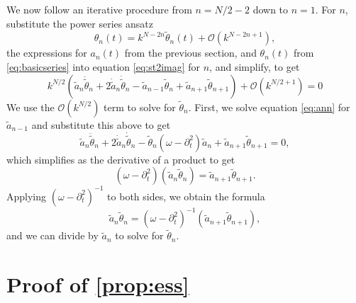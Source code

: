 \documentclass[11pt,reqno]{amsart}
\begin{document}
We now follow an iterative procedure from $n=N/2-2$ down to $n=1$. For $n$, substitute the power series ansatz
\[
\theta_{n}(t) = k^{N-2n} \tilde{\theta}_{n}(t) + \mathcal{O}(k^{N-2n+1}),
\]
the expressions for $a_n(t)$ from the previous section, and $\theta_n(t)$ from \cref{eq:basicseries} into equation \cref{eq:st2imag} for $n$, and simplify, to get
\[
k^{N/2} \left( \tilde{a}_n \ddot{\tilde{\theta}}_n + 2 \dot{\tilde{a}}_n \dot{\tilde{\theta}}_n
- \tilde{a}_{n-1} \tilde{\theta}_n + \tilde{a}_{n+1}\tilde{\theta}_{n+1} \right) + \mathcal{O}\left(k^{N/2+1}\right) = 0
\]
We use the $\mathcal{O}(k^{N/2})$ term to solve for $\tilde{\theta}_{n}$. First, we solve equation \cref{eq:ann} for $\tilde{a}_{n-1}$ and substitute this above to get
\[
\tilde{a}_n \ddot{\tilde{\theta}}_n + 2 \dot{\tilde{a}}_n \dot{\tilde{\theta}}_n
- \tilde{\theta}_n (\omega - \partial_t^2) \tilde{a}_n + \tilde{a}_{n+1} \tilde{\theta}_{n+1} = 0,
\]
which simplifies as the derivative of a product to get
\[
(\omega - \partial_t^2)\left( \tilde{a}_n \tilde{\theta}_n \right) = \tilde{a}_{n+1} \tilde{\theta}_{n+1}.
\]
Applying $(\omega - \partial_t^2)^{-1}$ to both sides, we obtain the formula
\begin{equation}\label{an2th}
\tilde{a}_n \tilde{\theta}_n = (\omega - \partial_t^2)^{-1} \left( \tilde{a}_{n+1} \tilde{\theta}_{n+1} \right),
\end{equation}
and we can divide by $\tilde{a}_n$ to solve for $\tilde{\theta}_n$. 

\section{Proof of \texorpdfstring{\cref{prop:ess}}{Proposition 1}}
\end{document}
